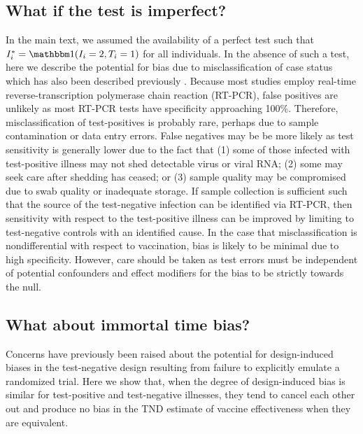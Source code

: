 \begin{appendix}
\subsection{What if the test is imperfect?} \label{sec:testing}
In the main text, we assumed the availability of a perfect test such that $I^*_i = \mathbbm 1 (I_i = 2, T_i = 1)$ for all individuals. In the absence of such a test, here we describe the potential for bias due to misclassification of case status which has also been described previously \cite{sullivan_theoretical_2016}. Because most studies employ real-time reverse-transcription polymerase chain reaction (RT-PCR), false positives are unlikely as most RT-PCR tests have specificity approaching 100\%. Therefore, misclassification of test-positives is probably rare, perhaps due to sample contamination or data entry errors. False negatives may be be more likely as test sensitivity is generally lower due to the fact that (1) some of those infected with test-positive illness may not shed detectable virus or viral RNA; (2) some may seek care after shedding has ceased; or (3) sample quality may be compromised due to swab quality or inadequate storage. If sample collection is sufficient such that the source of the test-negative infection can be identified via RT-PCR, then sensitivity with respect to the test-positive illness can be improved by limiting to test-negative controls with an identified cause. In the case that misclassification is nondifferential with respect to vaccination, bias is likely to be minimal due to high specificity. However, care should be taken as test errors must be independent of potential confounders and effect modifiers for the bias to be strictly towards the null. 

\subsection{What about immortal time bias?}
Concerns have previously been raised about the potential for design-induced biases in the test-negative design resulting from failure to explicitly emulate a randomized trial. Here we show that, when the degree of design-induced bias is similar for test-positive and test-negative illnesses, they tend to cancel each other out and produce no bias in the TND estimate of vaccine effectiveness when they are equivalent. 


\end{appendix}
